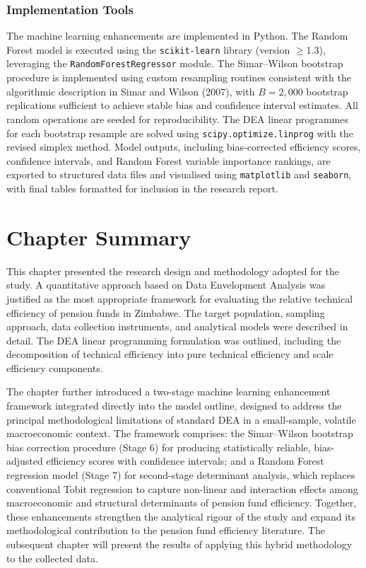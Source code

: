 \documentclass[12pt,a4paper]{article}
\begin{document}
\subsubsection{Implementation Tools}

The machine learning enhancements are implemented in Python. The Random Forest model is executed using the \texttt{scikit-learn} library (version $\geq$1.3), leveraging the \texttt{RandomForestRegressor} module. The Simar--Wilson bootstrap procedure is implemented using custom resampling routines consistent with the algorithmic description in Simar and Wilson (2007), with $B = 2{,}000$ bootstrap replications sufficient to achieve stable bias and confidence interval estimates. All random operations are seeded for reproducibility. The DEA linear programmes for each bootstrap resample are solved using \texttt{scipy.optimize.linprog} with the revised simplex method. Model outputs, including bias-corrected efficiency scores, confidence intervals, and Random Forest variable importance rankings, are exported to structured data files and visualised using \texttt{matplotlib} and \texttt{seaborn}, with final tables formatted for inclusion in the research report.

\section{Chapter Summary}

This chapter presented the research design and methodology adopted for the study. A quantitative approach based on Data Envelopment Analysis was justified as the most appropriate framework for evaluating the relative technical efficiency of pension funds in Zimbabwe. The target population, sampling approach, data collection instruments, and analytical models were described in detail. The DEA linear programming formulation was outlined, including the decomposition of technical efficiency into pure technical efficiency and scale efficiency components.

The chapter further introduced a two-stage machine learning enhancement framework integrated directly into the model outline, designed to address the principal methodological limitations of standard DEA in a small-sample, volatile macroeconomic context. The framework comprises: the Simar--Wilson bootstrap bias correction procedure (Stage 6) for producing statistically reliable, bias-adjusted efficiency scores with confidence intervals; and a Random Forest regression model (Stage 7) for second-stage determinant analysis, which replaces conventional Tobit regression to capture non-linear and interaction effects among macroeconomic and structural determinants of pension fund efficiency. Together, these enhancements strengthen the analytical rigour of the study and expand its methodological contribution to the pension fund efficiency literature. The subsequent chapter will present the results of applying this hybrid methodology to the collected data.
\end{document}
